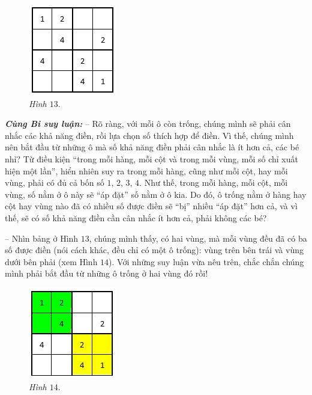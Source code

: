 	\begin{figure}
		\centering
		\captionsetup{labelformat= empty, justification=centering}
		\includegraphics[scale=1]{pic2}
		\caption{\small\textit{Hình $13.$}}
		\vspace*{-10pt}
	\end{figure}
	\textbf{\textit{Cùng Bi suy luận:}}
	\vskip 0.1cm
	-- Rõ ràng, với mỗi ô còn trống, chúng mình sẽ phải cân nhắc các khả năng điền, rồi lựa chọn số thích hợp để điền. Vì thế, chúng mình nên bắt đầu từ những ô mà số khả năng điền phải cân nhắc là ít hơn cả, các bé nhỉ? Từ điều kiện
	“trong mỗi hàng, mỗi cột và trong mỗi vùng, mỗi số chỉ xuất hiện một lần”, hiển nhiên suy ra trong mỗi hàng, cũng như mỗi cột, hay mỗi vùng, phải có đủ cả bốn số $1$, $2$, $3$, $4$. Như thế, trong mỗi hàng, mỗi cột, mỗi vùng, số nằm ở ô này sẽ “áp đặt” số nằm ở ô kia. Do đó, ô trống nằm ở hàng hay cột hay vùng nào đã có nhiều số được điền sẽ “bị” nhiều “áp đặt” hơn cả, và vì thế, sẽ có số khả năng điền cần cân nhắc ít hơn cả, phải không các bé?
	\vskip 0.1cm
	\begin{multicols}{2}
		-- Nhìn bảng ở Hình $13$, chúng mình thấy, có hai vùng, mà mỗi vùng đều đã có ba số được điền (nói cách khác, đều chỉ có một ô trống): vùng trên bên trái và vùng dưới bên phải (xem Hình $14$). Với những suy luận vừa nêu trên, chắc chắn chúng mình phải bắt đầu từ những ô trống ở hai vùng đó rồi!
		\begin{figure}[H]
			\centering
			\vspace*{5pt}
			\captionsetup{labelformat= empty, justification=centering}
			\includegraphics[scale=1]{pic3}
			\caption{\small\textit{Hình $14.$}}
			\vspace*{-10pt}
		\end{figure}
	\end{multicols}
